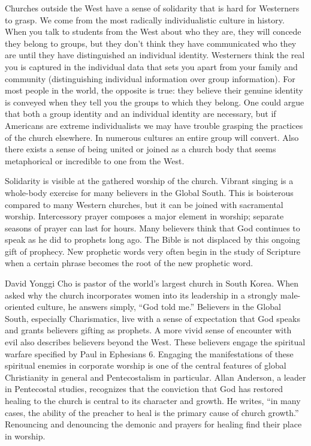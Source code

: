 Churches outside the West have a sense of solidarity that is hard for Westerners to grasp. We come
from the most radically individualistic culture in history. When you talk to students from the West
about who they are, they will concede they belong to groups, but they don’t think they have
communicated who they are until they have distinguished an individual identity. Westerners think the
real you is captured in the individual data that sets you apart from your family and community
(distinguishing individual information over group information). For most people in the world, the
opposite is true: they believe their genuine identity is conveyed when they tell you the groups to
which they belong. One could argue that both a group identity and an individual identity are
necessary, but if Americans are extreme individualists we may have trouble grasping the practices of
the church elsewhere. In numerous cultures an entire group will convert. Also there exists a sense
of being united or joined as a church body that seems metaphorical or incredible to one from the
West.

Solidarity is visible at the gathered worship of the church. Vibrant singing is a whole-body
exercise for many believers in the Global South. This is boisterous compared to many Western
churches, but it can be joined with sacramental worship. Intercessory prayer composes a major
element in worship; separate seasons of prayer can last for hours. Many believers think that God
continues to speak as he did to prophets long ago. The Bible is not displaced by this ongoing gift
of prophecy. New prophetic words very often begin in the study of Scripture when a certain phrase
becomes the root of the new prophetic word.

David Yonggi Cho is pastor of the world’s largest church in South Korea. When asked why the church
incorporates women into its leadership in a strongly male-oriented culture, he answers simply, “God
told me.” Believers in the Global South, especially Charismatics, live with a sense of expectation
that God speaks and grants believers gifting as prophets. A more vivid sense of encounter with evil
also describes believers beyond the West. These believers engage the spiritual warfare specified by
Paul in Ephesians 6. Engaging the manifestations of these spiritual enemies in corporate worship is
one of the central features of global Christianity in general and Pentecostalism in particular.
Allan Anderson, a leader in Pentecostal studies, recognizes that the conviction that God has
restored healing to the church is central to its character and growth. He writes, “in many cases,
the ability of the preacher to heal is the primary cause of church growth.” Renouncing and
denouncing the demonic and prayers for healing find their place in worship.

